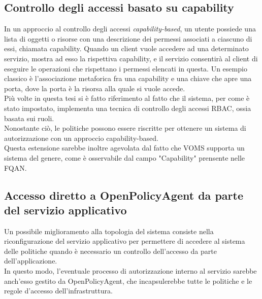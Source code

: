 \subsection{Controllo degli accessi basato su capability}
In un approccio al controllo degli accessi \textit{capability-based}, un utente possiede una lista di oggetti o risorse con una descrizione dei 
permessi associati a ciascuno di essi, chiamata capability. Quando un client vuole accedere ad una determinato servizio, mostra ad esso la rispettiva
 capability, e il servizio consentirà al client di eseguire le operazioni che rispettano i permessi elencati in questa.  
 Un esempio classico è l'associazione metaforica fra una capability e una chiave che apre una porta, dove la porta è la risorsa alla quale si vuole accede.  
\\ Più volte in questa tesi si è fatto riferimento al fatto che il sistema, per come è stato impostato, implementa una tecnica 
di controllo degli accessi RBAC, ossia basata sui ruoli.
\\ Nonostante ciò, le politiche possono essere riscritte per ottenere un sistema di autorizzazione con un approccio capability-based.
\\ Questa estensione sarebbe inoltre agevolata dal fatto che VOMS supporta un sistema del genere, come è osservabile dal campo "Capability" prensente nelle FQAN.

\subsection{Accesso diretto a OpenPolicyAgent da parte del servizio applicativo}
Un possibile miglioramento alla topologia del sistema consiste nella riconfigurazione del servizio applicativo 
per permettere di accedere al sistema delle politiche quando è necessario un controllo dell'accesso da parte dell'applicazione. 
\\ In questo modo, l'eventuale processo di autorizzazione interno al servizio sarebbe anch'esso gestito da OpenPolicyAgent, 
che incapsulerebbe tutte le politiche e le regole d'accesso dell'infrastruttura.

